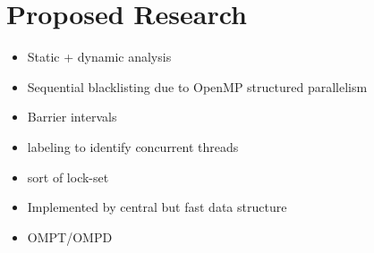 \section{Proposed Research}
\label{sec:proposedresearch}

\begin{itemize}
\item Static + dynamic analysis
\item Sequential blacklisting due to OpenMP structured parallelism
\item Barrier intervals
\item labeling to identify concurrent threads
\item sort of lock-set
\item Implemented by central but fast data structure
\item OMPT/OMPD
\end{itemize}

